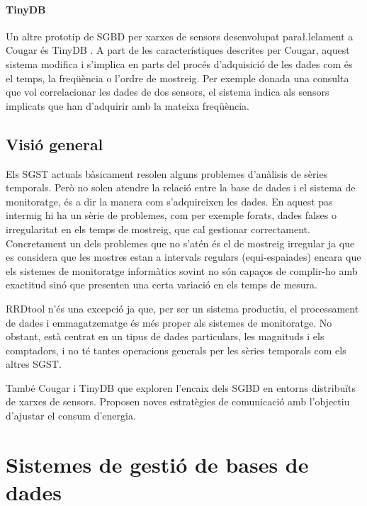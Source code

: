 \paragraph{TinyDB} Un altre prototip de SGBD per xarxes de sensors desenvolupat para\l.lelament a Cougar és TinyDB \parencite{tinyDB}. A part de les característiques descrites per Cougar, aquest sistema  modifica i s'implica en parts del procés d'adquisició de les dades com és el temps, la freqüència o l'ordre de mostreig. Per exemple donada una consulta que vol correlacionar les dades de dos sensors, el sistema indica als sensors implicats que han d'adquirir amb la mateixa freqüència.







\subsection{Visió general}

Els SGST actuals bàsicament resolen alguns problemes d'anàlisis de sèries temporals.
Però no solen atendre la relació entre la base de dades i el sistema de monitoratge, és a dir la manera com s'adquireixen les dades. En aquest pas intermig hi ha un sèrie de problemes, com per exemple forats, dades falses o irregularitat en els temps de mostreig, que cal gestionar correctament. Concretament un dels problemes que no s'atén és el de mostreig irregular ja que es considera que les mostres estan a intervals regulars (equi-espaiades) encara que els sistemes de monitoratge informàtics sovint no són capaços de complir-ho amb exactitud sinó que presenten una certa variació en els temps de mesura. 

RRDtool n'és una excepció ja que, per ser un sistema productiu, el processament de dades i emmagatzematge és més proper als sistemes de monitoratge. No obstant, està centrat en un tipus de dades particulars, les magnituds i els comptadors, i no té tantes operacions generals per les sèries temporals com els altres SGST.

També Cougar i TinyDB que exploren l'encaix dels SGBD en entorns distribuïts de xarxes de sensors. Proposen noves estratègies de comunicació amb l'objectiu d'ajustar el consum d'energia. 




\section[SGBD]{Sistemes de gestió de bases de dades}
\label{sec:art:sgbd}



